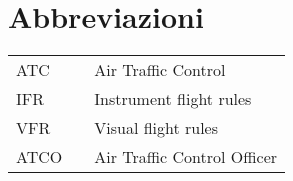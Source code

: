 \cleardoublepage %
\chapter*{Abbreviazioni} %


\begin{tabular}{lll}
    ATC & \hspace{3cm} & Air Traffic Control \\
    IFR & \hspace{3cm} & Instrument flight rules \\
    VFR & \hspace{3cm} & Visual flight rules \\
    ATCO & \hspace{3cm} & Air Traffic Control Officer \\
    
\end{tabular}
